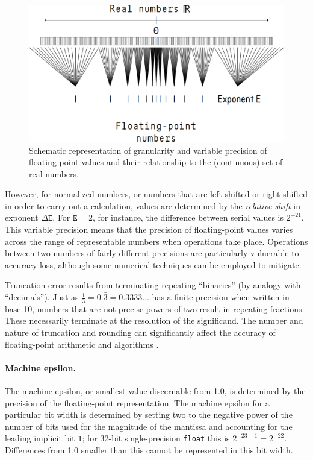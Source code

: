 \documentclass[twoside]{article}
\begin{document}
\begin{figure}[htb]
\includegraphics[width=\textwidth]{img/fp-res}
\caption{Schematic representation of granularity and variable precision of floating-point values and their relationship to the (continuous) set of real numbers.}
\label{fig:fp-res}
\end{figure}

However, for normalized numbers, or numbers that are left-shifted or right-shifted in order to carry out a calculation, values are determined by the \emph{relative shift} in exponent $\Delta\texttt{E}$.  For $\texttt{E} = 2$, for instance, the difference between serial values is $2^{-21}$.  This variable precision means that the precision of floating-point values varies across the range of representable numbers when operations take place.  Operations between two numbers of fairly different precisions are particularly vulnerable to accuracy loss, although some numerical techniques can be employed to mitigate.

Truncation error results from terminating repeating “binaries” (by analogy with “decimals”).  Just as $\frac{1}{3} = 0.\bar{3} = 0.3333\ldots{}$ has a finite precision when written in base-10, numbers that are not precise powers of two result in repeating fractions.  These necessarily terminate at the resolution of the significand.  The number and nature of truncation and rounding can significantly affect the accuracy of floating-point arithmetic and algorithms \citep{Izquierdo2006}.
 
\paragraph{Machine epsilon.}

The machine epsilon, or smallest value discernable from 1.0, is determined by the precision of the floating-point representation.  The machine epsilon for a particular bit width is determined by setting two to the negative power of the number of bits used for the magnitude of the mantissa and accounting for the leading implicit bit \texttt{1}; for 32-bit single-precision \texttt{float} this is $2^{-{23-1}} = 2^{-22}$.  Differences from 1.0 smaller than this cannot be represented in this bit width.
\end{document}
